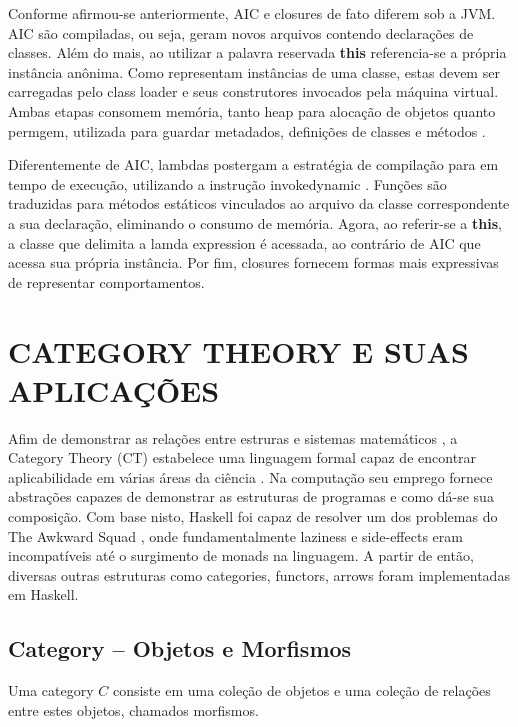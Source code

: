 \documentclass[10pt, conference]{IEEEtran}
\begin{document}
Conforme afirmou-se anteriormente, AIC e closures de fato diferem sob a JVM. AIC são compiladas, ou seja, geram novos arquivos contendo declarações de classes. Além do mais, ao utilizar a palavra reservada \textbf{this} referencia-se a própria instância anônima. Como representam instâncias de uma classe, estas devem ser carregadas pelo class loader e seus construtores invocados pela máquina virtual. Ambas etapas consomem memória, tanto heap para alocação de objetos quanto permgem, utilizada para guardar metadados, definições de classes e métodos \cite{hunt2011java}.

Diferentemente de AIC, lambdas postergam a estratégia de compilação para em tempo de execução, utilizando a instrução invokedynamic \cite{goetz2012translation}. Funções são traduzidas para métodos estáticos vinculados ao arquivo da classe correspondente a sua declaração, eliminando o consumo de memória. Agora, ao referir-se a \textbf{this}, a classe que delimita a lamda expression é acessada, ao contrário de AIC que acessa sua própria instância. Por fim, closures fornecem formas mais expressivas de representar comportamentos.

\section{CATEGORY THEORY E SUAS APLICAÇÕES}

Afim de demonstrar as relações entre estruras e sistemas matemáticos \cite{maclane1971mat}, a Category Theory (CT) estabelece uma linguagem formal capaz de encontrar aplicabilidade em várias áreas da ciência \cite{spivak2014cts}. Na computação seu emprego fornece abstrações capazes de demonstrar as estruturas de programas e como dá-se sua composição. Com base nisto, Haskell foi capaz de resolver um dos problemas do The Awkward Squad \cite{jones2001tacklingthe}, onde fundamentalmente laziness e side-effects eram incompatíveis até o surgimento de monads \cite{mogi1991monad} na linguagem. A partir de então, diversas outras estruturas como categories, functors, arrows foram implementadas em Haskell. 

\subsection{Category -- Objetos e Morfismos}

Uma category $C$ consiste em uma coleção de objetos e uma coleção de relações entre estes objetos, chamados morfismos.\\
\end{document}
